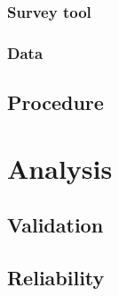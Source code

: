 \subsubsection{Survey tool}
\subsubsection{Data}

\subsection{Procedure}

\section{Analysis}
\label{sec:survey-analysis}

\subsection{Validation}
\subsection{Reliability}


